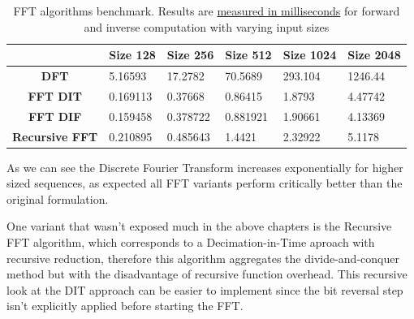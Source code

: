 \documentclass[
  oneside,
  11pt, a4paper,
  footinclude=true,
  headinclude=true,
  cleardoublepage=empty
]{scrbook}
\begin{document}
\begin{table}[h]
    \centering
    \normalsize
    \sffamily
    \renewcommand{\arraystretch}{1.5}%
    \begin{tabular}{|c|l|l|l|l|l|}
        \hline
        \multicolumn{1}{|l|}{} & \multicolumn{1}{c|}{\textbf{Size 128}} & \multicolumn{1}{c|}{\textbf{Size 256}} & \multicolumn{1}{c|}{\textbf{Size 512}} & \multicolumn{1}{c|}{\textbf{Size 1024}} & \multicolumn{1}{c|}{\textbf{Size 2048}} \\ \hline
        \textbf{DFT}           & 5.16593                                & 17.2782                                & 70.5689                                & 293.104                                 & 1246.44                                 \\ \hline
        \textbf{FFT  DIT}      & 0.169113                               & 0.37668                                & 0.86415                                & 1.8793                                  & 4.47742                                 \\ \hline
        \textbf{FFT DIF}       & 0.159458                               & 0.378722                               & 0.881921                               & 1.90661                                 & 4.13369                                 \\ \hline
        \textbf{Recursive FFT} & 0.210895                               & 0.485643                               & 1.4421                                 & 2.32922                                 & 5.1178                                  \\ \hline
    \end{tabular}
    \caption{FFT algorithms benchmark. Results are \underline{measured in milliseconds} for forward and inverse computation with varying input sizes}
    \label{tab:benchmarking}
\end{table}

As we can see the Discrete Fourier Transform increases exponentially for higher sized sequences, as expected all FFT variants perform critically better than the original formulation.

One variant that wasn't exposed much in the above chapters is the Recursive FFT algorithm, which corresponds to a Decimation-in-Time aproach with recursive reduction, therefore this algorithm aggregates the divide-and-conquer method but with the disadvantage of recursive function overhead. This recursive look at the DIT approach can be easier to implement since the bit reversal step isn't explicitly applied before starting the FFT.
\end{document}
